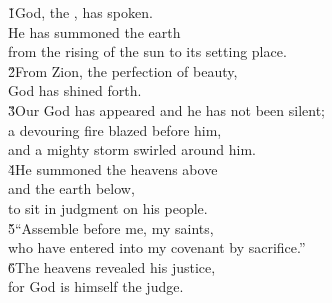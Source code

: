\begin{poetry}
\poeml \v{1}God, the , has spoken. \\
\poemll    He has summoned the earth \\
\poemlll       from the rising of the sun to its setting place. \\
\poeml \v{2}From Zion, the perfection of beauty, \\
\poemll    God has shined forth. \\
\poeml \v{3}Our God has appeared and he has not been silent; \\
\poemll    a devouring fire blazed before him, \\
\poemlll       and a mighty storm swirled around him. \\
\poeml \v{4}He summoned the heavens above \\
\poemll    and the earth below, \\
\poemlll       to sit in judgment on his people. \\
\poeml \v{5}``Assemble before me, my saints, \\
\poemll    who have entered into my covenant by sacrifice.'' \\
\poeml \v{6}The heavens revealed his justice, \\
\poemll    for God is himself the judge.
\end{poetry}

